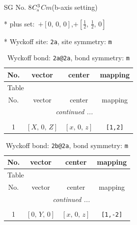 \documentclass[fleqn,8pt]{jsarticle}
\begin{document}
\setcounter{MaxMatrixCols}{32}

\renewcommand{\tablename}{Table~}
\renewcommand{\figurename}{Figure~}
\begin{center}
\LARGE
SG No. 8\quad$C_{\rm s}^{3}$\quad$Cm$\quad(b-axis setting)\quad[ monoclinic ]
\end{center}

* plus set:\,\,\,$+\left[ 0,\, 0,\, 0 \right]$,\quad $+\left[ \frac{1}{2},\, \frac{1}{2},\, 0 \right]$


* Wyckoff site: {\tt 2a}, site symmetry: {\tt m}
\renewcommand{\arraystretch}{1.2}
\begin{longtable}{cccc}
\caption{Wyckoff bond: {\tt 2a@2a}, bond symmetry: {\tt m}}
 \\
 \hline \hline
No. & vector & center & mapping \\ \hline \endfirsthead

\multicolumn{3}{l}{\tablename\ \thetable{}} \\
 \hline \hline
No. & vector & center & mapping \\ \hline \endhead

 \hline \hline
\multicolumn{3}{r}{\footnotesize\it continued ...} \\ \endfoot

 \hline \hline
\multicolumn{3}{r}{} \\ \endlastfoot

1 & $\left[ X,\, 0,\, Z \right]$ & $\left[ x,\, 0,\, z \right]$ & {\tt [1,2]} \\
\end{longtable}
\renewcommand{\arraystretch}{1.2}
\begin{longtable}{cccc}
\caption{Wyckoff bond: {\tt 2b@2a}, bond symmetry: {\tt m}}
 \\
 \hline \hline
No. & vector & center & mapping \\ \hline \endfirsthead

\multicolumn{3}{l}{\tablename\ \thetable{}} \\
 \hline \hline
No. & vector & center & mapping \\ \hline \endhead

 \hline \hline
\multicolumn{3}{r}{\footnotesize\it continued ...} \\ \endfoot

 \hline \hline
\multicolumn{3}{r}{} \\ \endlastfoot

1 & $\left[ 0,\, Y,\, 0 \right]$ & $\left[ x,\, 0,\, z \right]$ & {\tt [1,-2]} \\
\end{longtable}
\end{document}
